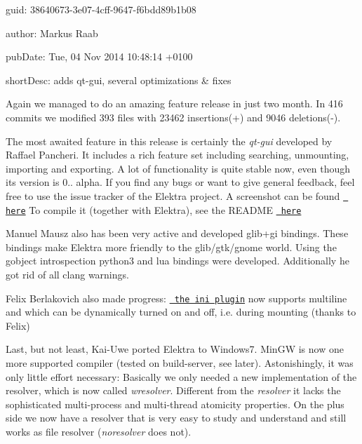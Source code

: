 
\begin{DoxyItemize}
\item guid\+: 38640673-\/3e07-\/4cff-\/9647-\/f6bdd89b1b08
\item author\+: Markus Raab
\item pub\+Date\+: Tue, 04 Nov 2014 10\+:48\+:14 +0100
\item short\+Desc\+: adds qt-\/gui, several optimizations \& fixes
\end{DoxyItemize}

Again we managed to do an amazing feature release in just two month. In 416 commits we modified 393 files with 23462 insertions(+) and 9046 deletions(-\/).

The most awaited feature in this release is certainly the {\itshape qt-\/gui} developed by Raffael Pancheri. It includes a rich feature set including searching, unmounting, importing and exporting. A lot of functionality is quite stable now, even though its version is 0.. alpha. If you find any bugs or want to give general feedback, feel free to use the issue tracker of the Elektra project. A screenshot can be found \href{https://github.com/ElektraInitiative/libelektra/blob/master/doc/images/screenshot-qt-gui.png}{\texttt{ here}} To compile it (together with Elektra), see the R\+E\+A\+D\+ME \href{https://github.com/ElektraInitiative/libelektra/tree/master/src/tools/qt-gui}{\texttt{ here}}

Manuel Mausz also has been very active and developed glib+gi bindings. These bindings make Elektra more friendly to the glib/gtk/gnome world. Using the gobject introspection python3 and lua bindings were developed. Additionally he got rid of all clang warnings.

Felix Berlakovich also made progress\+: \href{https://github.com/ElektraInitiative/libelektra/tree/master/src/plugins/ini}{\texttt{ the ini plugin}} now supports multiline and which can be dynamically turned on and off, i.\+e. during mounting (thanks to Felix)

Last, but not least, Kai-\/\+Uwe ported Elektra to Windows7. Min\+GW is now one more supported compiler (tested on build-\/server, see later). Astonishingly, it was only little effort necessary\+: Basically we only needed a new implementation of the resolver, which is now called {\itshape wresolver}. Different from the {\itshape resolver} it lacks the sophisticated multi-\/process and multi-\/thread atomicity properties. On the plus side we now have a resolver that is very easy to study and understand and still works as file resolver ({\itshape noresolver} does not).

